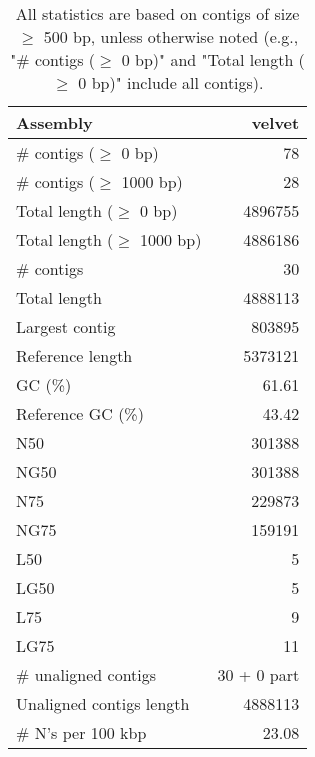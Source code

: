 \documentclass[12pt,a4paper]{article}
\begin{document}
\begin{table}[ht]
\begin{center}
\caption{All statistics are based on contigs of size $\geq$ 500 bp, unless otherwise noted (e.g., "\# contigs ($\geq$ 0 bp)" and "Total length ($\geq$ 0 bp)" include all contigs).}
\begin{tabular}{|l*{1}{|r}|}
\hline
Assembly & velvet \\ \hline
\# contigs ($\geq$ 0 bp) & 78 \\ \hline
\# contigs ($\geq$ 1000 bp) & 28 \\ \hline
Total length ($\geq$ 0 bp) & 4896755 \\ \hline
Total length ($\geq$ 1000 bp) & 4886186 \\ \hline
\# contigs & 30 \\ \hline
Total length & 4888113 \\ \hline
Largest contig & 803895 \\ \hline
Reference length & 5373121 \\ \hline
GC (\%) & 61.61 \\ \hline
Reference GC (\%) & 43.42 \\ \hline
N50 & 301388 \\ \hline
NG50 & 301388 \\ \hline
N75 & 229873 \\ \hline
NG75 & 159191 \\ \hline
L50 & 5 \\ \hline
LG50 & 5 \\ \hline
L75 & 9 \\ \hline
LG75 & 11 \\ \hline
\# unaligned contigs & 30 + 0 part \\ \hline
Unaligned contigs length & 4888113 \\ \hline
\# N's per 100 kbp & 23.08 \\ \hline
\end{tabular}
\end{center}
\end{table}
\end{document}
